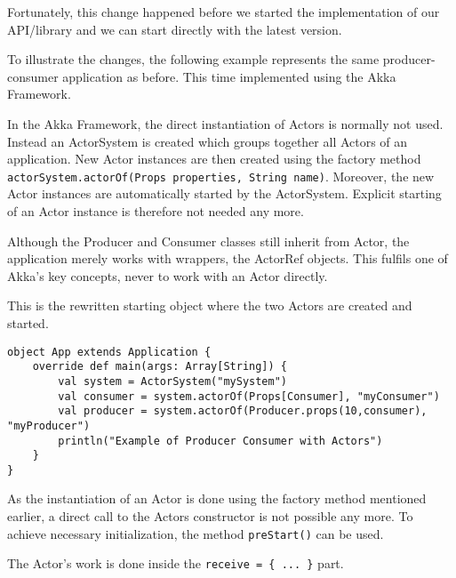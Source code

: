 \documentclass[
	a4paper,					10pt,							twoside,					openright,				notitlepage,			parskip=half,			]{scrreprt}
\begin{document}
Fortunately, this change happened before we started the implementation of our API/library 
and we can start directly with the latest version.

To illustrate the changes, the following example represents the same producer-consumer application as before.
This time implemented using the Akka Framework.

In the Akka Framework, the direct instantiation of Actors is normally not used. 
Instead an ActorSystem is created which groups together all Actors of an application. 
New Actor instances are then created using the factory method \verb|actorSystem.actorOf(Props properties, String name)|.
Moreover, the new Actor instances are automatically started by the ActorSystem. 
Explicit starting of an Actor instance is therefore not needed any more.

Although the Producer and Consumer classes still inherit from Actor, the application merely works with 
wrappers, the ActorRef objects. This fulfils one of Akka's key concepts, never to work with an Actor directly.

This is the rewritten starting object where the two Actors are created and started.
\begin{lstlisting}
object App extends Application {
	override def main(args: Array[String]) {
	    val system = ActorSystem("mySystem")
	    val consumer = system.actorOf(Props[Consumer], "myConsumer")
	    val producer = system.actorOf(Producer.props(10,consumer), "myProducer")
	    println("Example of Producer Consumer with Actors")
	}
}
\end{lstlisting}

As the instantiation of an Actor is done using the factory method mentioned earlier, 
a direct call to the Actors constructor is not possible any more. To achieve necessary 
initialization, the method \verb|preStart()| can be used. 

The Actor's work is done inside the 
\verb|receive = { ... }| part. 
\end{document}
